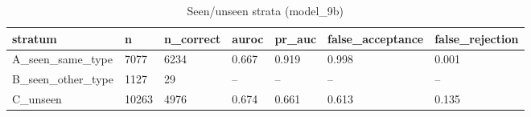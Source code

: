 \begin{table}[t]
\centering
\small
\begin{tabular}{lllllll}
\hline
stratum & n & n\_correct & auroc & pr\_auc & false\_acceptance & false\_rejection \\
\hline
A\_seen\_same\_type & 7077 & 6234 & 0.667 & 0.919 & 0.998 & 0.001 \\
B\_seen\_other\_type & 1127 & 29 & -- & -- & -- & -- \\
C\_unseen & 10263 & 4976 & 0.674 & 0.661 & 0.613 & 0.135 \\
\hline
\end{tabular}
\caption{Seen/unseen strata (model\_9b)}
\label{tab:strata_model_9b}
\end{table}

